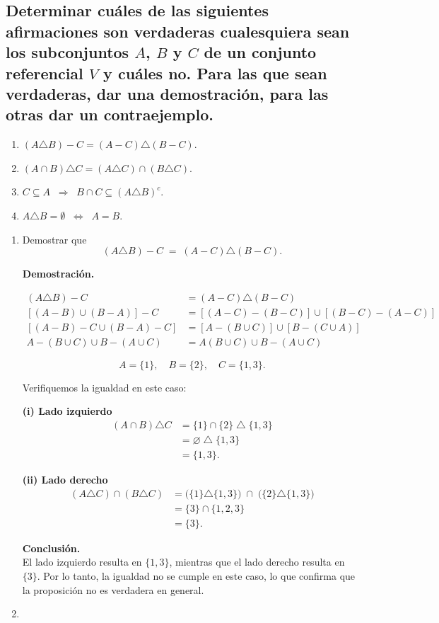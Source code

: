 \documentclass[11pt]{article}
\begin{document}
\subsection{Determinar cuáles de las siguientes afirmaciones son verdaderas 
cualesquiera sean los subconjuntos $A$, $B$ y $C$ de un conjunto referencial $V$ 
y cuáles no. Para las que sean verdaderas, dar una demostración, para las otras dar un contraejemplo. }

\begin{enumerate}[label=\roman*)]
  \item $(A \triangle B) - C = (A - C) \triangle (B - C).$
  \item $(A \cap B) \triangle C = (A \triangle C) \cap (B \triangle C).$
  \item $C \subseteq A \;\;\Rightarrow\;\; B \cap C \subseteq (A \triangle B)^c.$
  \item $A \triangle B = \emptyset \;\;\Leftrightarrow\;\; A = B.$
\end{enumerate}

\begin{enumerate}[label=\roman*)]
\item Demostrar que
\[
(A \triangle B) - C \;=\; (A - C) \triangle (B - C).
\]

\textbf{Demostración.} 

\begin{align*}
    (A \triangle B) - C &= (A - C) \triangle (B - C ) \\
    [(A - B) \cup (B - A)] - C &= [(A - C) - (B - C)] \cup [(B - C) - (A - C)] \\
    [(A - B) - C \cup (B - A) - C] &= [A - (B \cup C)] \cup [B - (C \cup A)] \\
    A - (B \cup C) \cup B - (A \cup C) &= A (B \cup C) \cup B - (A \cup C)
\end{align*}

\[
A = \{1\}, \quad B = \{2\}, \quad C = \{1,3\}.
\]

Verifiquemos la igualdad en este caso:

\textbf{(i) Lado izquierdo}
\begin{align*}
(A \cap B) \triangle C 
&= \{1\}\cap\{2\} \;\triangle\; \{1,3\} \\
&= \varnothing \;\triangle\; \{1,3\} \\
&= \{1,3\}.
\end{align*}

\textbf{(ii) Lado derecho}
\begin{align*}
(A \triangle C)\cap(B \triangle C) 
&= \big(\{1\}\triangle\{1,3\}\big) \;\cap\; \big(\{2\}\triangle\{1,3\}\big) \\
&= \{3\}\cap\{1,2,3\} \\
&= \{3\}.
\end{align*}

\textbf{Conclusión.} \\
El lado izquierdo resulta en $\{1,3\}$, mientras que el lado derecho resulta en $\{3\}$. 
Por lo tanto, la igualdad no se cumple en este caso, lo que confirma que la proposición no es verdadera en general.

\item 
\end{enumerate}
\end{document}
